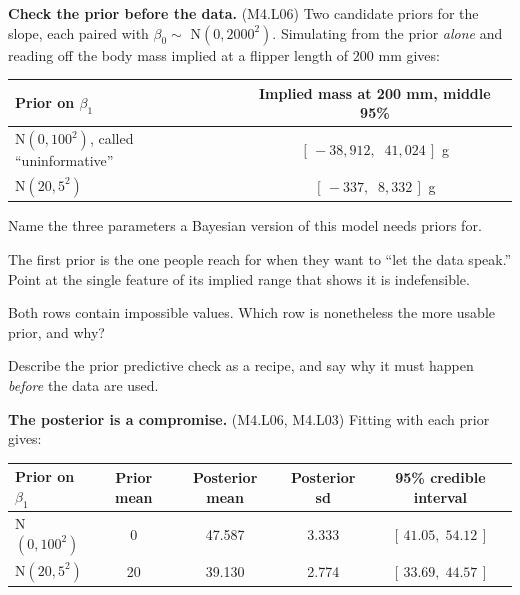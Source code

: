 \documentclass[11pt]{article}
\newcommand{\answerspace}[1]{\vspace{#1}}
\newcommand{\lo}[1]{{\normalfont\small (#1)}}
\begin{document}
\begin{questions}

\item \textbf{Check the prior before the data.} \lo{M4.L06} Two candidate priors for the slope, each
paired with $\beta_0 \sim$ N$(0, 2000^2)$. Simulating from the prior \emph{alone} and reading off the
body mass implied at a flipper length of $200$ mm gives:

\begin{center}
\renewcommand{\arraystretch}{1.2}
\begin{tabular}{lc}
\toprule
\textbf{Prior on $\beta_1$} & \textbf{Implied mass at 200 mm, middle 95\%} \\
\midrule
N$(0, 100^2)$, called ``uninformative'' & $[\,-38{,}912,\;\; 41{,}024\,]$ g \\
N$(20, 5^2)$ & $[\,-337,\;\; 8{,}332\,]$ g \\
\bottomrule
\end{tabular}
\end{center}

\begin{parts}
\item Name the three parameters a Bayesian version of this model needs priors for.
\answerspace{3em}

\item The first prior is the one people reach for when they want to ``let the data speak.'' Point at
the single feature of its implied range that shows it is indefensible.
\answerspace{3.5em}

\item Both rows contain impossible values. Which row is nonetheless the more usable prior, and why?
\answerspace{4em}

\item Describe the prior predictive check as a recipe, and say why it must happen \emph{before} the
data are used.
\answerspace{4em}
\end{parts}

\item \textbf{The posterior is a compromise.} \lo{M4.L06, M4.L03} Fitting with each prior gives:

\begin{center}
\renewcommand{\arraystretch}{1.25}
\begin{tabular}{lcccc}
\toprule
\textbf{Prior on $\beta_1$} & \textbf{Prior mean} & \textbf{Posterior mean} & \textbf{Posterior sd} & \textbf{95\% credible interval} \\
\midrule
N$(0, 100^2)$ & 0 & 47.587 & 3.333 & $[\,41.05,\; 54.12\,]$ \\
N$(20, 5^2)$ & 20 & 39.130 & 2.774 & $[\,33.69,\; 44.57\,]$ \\
\bottomrule
\end{tabular}
\end{center}


\end{questions}
\end{document}
